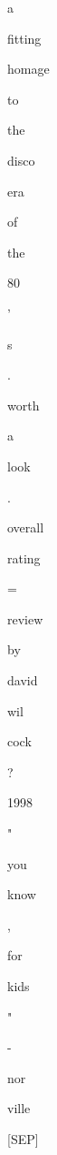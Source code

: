 \documentclass[varwidth=150mm]{standalone}
\begin{document}
\begin{CJK*}{UTF8}{gbsn}
{{{\colorbox{red!2.564303398132324}{\strut a} \colorbox{red!0.0}{\strut fitting} \colorbox{red!0.0}{\strut homage} \colorbox{red!0.0}{\strut to} \colorbox{red!1.0929484367370605}{\strut the} \colorbox{red!28.476770401000977}{\strut disco} \colorbox{red!2.14391827583313}{\strut era} \colorbox{red!1.0200449228286743}{\strut of} \colorbox{red!0.0}{\strut the} \colorbox{red!9.379080772399902}{\strut 80} \colorbox{red!2.13649845123291}{\strut '} \colorbox{red!5.5160136222839355}{\strut s} \colorbox{red!3.190934896469116}{\strut .} \colorbox{red!0.0}{\strut worth} \colorbox{red!1.2786781787872314}{\strut a} \colorbox{red!1.6147114038467407}{\strut look} \colorbox{red!0.0}{\strut .} \colorbox{red!5.319730281829834}{\strut overall} \colorbox{red!5.972592353820801}{\strut rating} \colorbox{red!3.389800786972046}{\strut =} \colorbox{red!6.64144229888916}{\strut review} \colorbox{red!0.0}{\strut by} \colorbox{red!10.832240104675293}{\strut david} \colorbox{red!8.333620071411133}{\strut wil}\colorbox{red!12.300345420837402}{\strut cock} \colorbox{red!16.53153419494629}{\strut ?} \colorbox{red!23.062875747680664}{\strut 1998} \colorbox{red!42.96366500854492}{\strut "} \colorbox{red!0.0}{\strut you} \colorbox{red!2.6848483085632324}{\strut know} \colorbox{red!2.654019832611084}{\strut ,} \colorbox{red!1.0097988843917847}{\strut for} \colorbox{red!3.912135362625122}{\strut kids} \colorbox{red!70.48753356933594}{\strut "} \colorbox{red!41.572593688964844}{\strut -} \colorbox{red!9.135552406311035}{\strut nor}\colorbox{red!11.352178573608398}{\strut ville} \colorbox{red!5.5977959632873535}{\strut [SEP]}
}}}
\end{CJK*}
\end{document}
